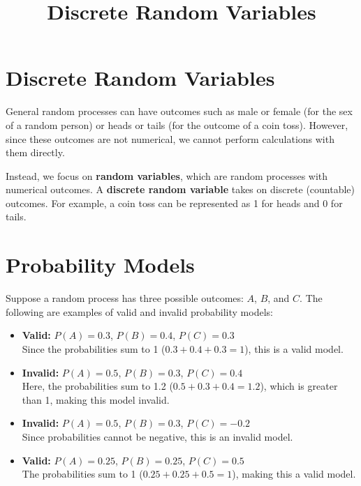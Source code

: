 \documentclass{article}
\title{Discrete Random Variables}
\author{}
\date{}
\begin{document}
\maketitle

\section{Discrete Random Variables}
General random processes can have outcomes such as male or female (for the sex of a random person) or heads or tails (for the outcome of a coin toss). However, since these outcomes are not numerical, we cannot perform calculations with them directly.

Instead, we focus on \textbf{random variables}, which are random processes with numerical outcomes. A \textbf{discrete random variable} takes on discrete (countable) outcomes. For example, a coin toss can be represented as 1 for heads and 0 for tails.

\section{Probability Models}
Suppose a random process has three possible outcomes: $A$, $B$, and $C$. The following are examples of valid and invalid probability models:

\begin{itemize}
    \item \textbf{Valid:} $P(A) = 0.3$, $P(B) = 0.4$, $P(C) = 0.3$ \\
    Since the probabilities sum to 1 ($0.3 + 0.4 + 0.3 = 1$), this is a valid model.
    
    \item \textbf{Invalid:} $P(A) = 0.5$, $P(B) = 0.3$, $P(C) = 0.4$ \\
    Here, the probabilities sum to 1.2 ($0.5 + 0.3 + 0.4 = 1.2$), which is greater than 1, making this model invalid.
    
    \item \textbf{Invalid:} $P(A) = 0.5$, $P(B) = 0.3$, $P(C) = -0.2$ \\
    Since probabilities cannot be negative, this is an invalid model.
    
    \item \textbf{Valid:} $P(A) = 0.25$, $P(B) = 0.25$, $P(C) = 0.5$ \\
    The probabilities sum to 1 ($0.25 + 0.25 + 0.5 = 1$), making this a valid model.
\end{itemize}
\end{document}
